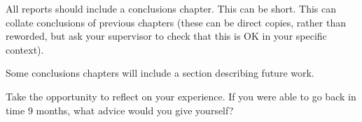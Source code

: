 All reports should include a conclusions chapter. This can be short. This can collate conclusions of previous chapters (these can be direct copies, rather than reworded, but ask your supervisor to check that this is OK in your specific context).

Some conclusions chapters will include a section describing future work. 

Take the opportunity to reflect on your experience. If you were able to go back in time 9 months, what advice would you give yourself?
